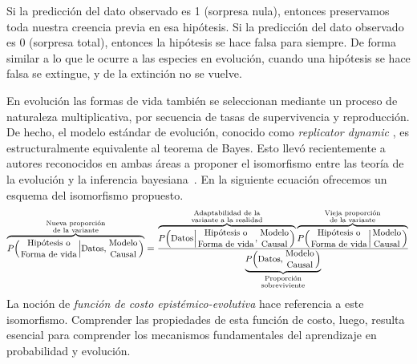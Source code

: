 \documentclass[a4paper,11pt]{book}
\newcommand\hfrac[2]{\genfrac{}{}{0pt}{}{#1}{#2}} %
\theoremstyle{definition}
\begin{document}

\noindent
Si la predicci\'on del dato observado es 1 (sorpresa nula), entonces preservamos toda nuestra creencia previa en esa hip\'otesis.
%
Si la predicci\'on del dato observado es 0 (sorpresa total), entonces la hip\'otesis se hace falsa para siempre.
%
De forma similar a lo que le ocurre a las especies en evoluci\'on, cuando una hip\'otesis se hace falsa se extingue, y de la extinci\'on no se vuelve.


En evoluci\'on las formas de vida tambi\'en se seleccionan mediante un proceso de naturaleza multiplicativa, por secuencia de tasas de supervivencia y reproducci\'on.
%
De hecho, el modelo est\'andar de evoluci\'on, conocido como \emph{replicator dynamic} \cite{taylor1978-replicatorDynamic}, es estructuralmente equivalente al teorema de Bayes.
%
Esto llev\'o recientemente a autores reconocidos en ambas \'areas a proponer el isomorfismo entre las teor\'ia de la evoluci\'on y la inferencia bayesiana~\cite{czegel2019-bayesianEvolution, czegel2022-bayesDarwin}.
%
En la siguiente ecuaci\'on ofrecemos un esquema del isomorfismo propuesto.
%
\begin{equation*} \small
\overbrace{P\Big(\hfrac{\text{Hip\'otesis o}}{\text{Forma de vida}}  \Big| \text{Datos}, \hfrac{\text{Modelo}}{\text{Causal}} \Big)}^{\hfrac{\text{\scriptsize Nueva proporci\'on}}{\text{\scriptsize de la variante}}} = \frac{ \overbrace{P\Big(\text{Datos}  \Big|  \hfrac{\text{Hip\'otesis o}}{\text{Forma de vida}}  , \hfrac{\text{Modelo}}{\text{Causal}} \Big)}^{\hfrac{\text{\scriptsize Adaptabilidad de la}}{\text{\scriptsize variante a la realidad}}} \overbrace{P\Big(\hfrac{\text{Hip\'otesis o}}{\text{Forma de vida}} \Big|  \hfrac{\text{Modelo}}{\text{Causal}} \Big)}^{\hfrac{\text{\scriptsize Vieja proporci\'on}}{\text{\scriptsize de la variante}}}}{\underbrace{P\Big(\text{Datos},  \hfrac{\text{\small Modelo}}{\text{\small Causal}} \Big)}_{\hfrac{\text{\scriptsize Proporci\'on}}{\text{\scriptsize sobreviviente}}}}
\end{equation*}
%
La noci\'on de \emph{funci\'on de costo epist\'emico-evolutiva} hace referencia a este isomorfismo.
%
Comprender las propiedades de esta funci\'on de costo, luego, resulta esencial para comprender los mecanismos fundamentales del aprendizaje en probabilidad y evoluci\'on.
\end{document}
